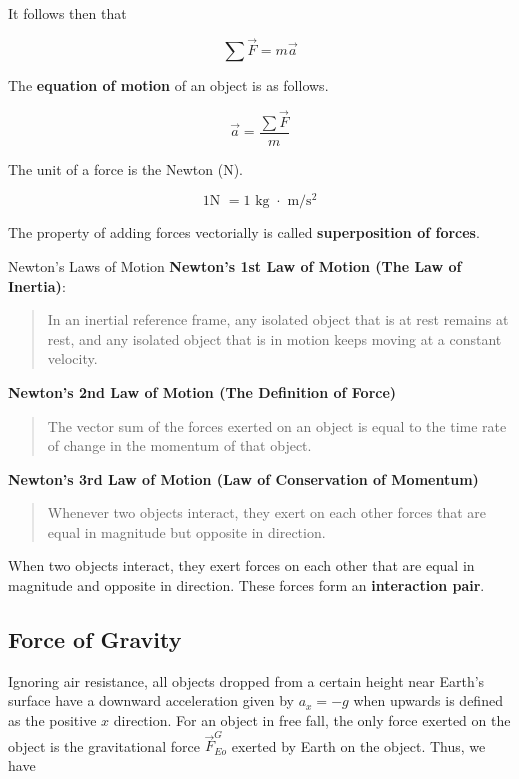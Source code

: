         It follows then that

        \[
            \sum \vec{F} = m\vec{a}
        \]

        The \textbf{equation of motion} of an object is as follows.

        \[
            \vec{a} = \frac{\sum \vec{F}}{m}
        \]

        The unit of a force is the Newton (N).

        \[
            1 \text{N } = 1 \text{ kg } \cdot \text{ m/}\text{s}^2
        \]

        The property of adding forces vectorially is called \textbf{superposition of forces}.

        \begin{tbhtheorem}{Newton's Laws of Motion}
            \textbf{Newton's 1st Law of Motion (The Law of Inertia)}:
            \begin{quote}
                In an inertial reference frame, any isolated object that is at rest remains at rest, and any isolated object that is in motion keeps moving at a constant velocity.
            \end{quote}

            \textbf{Newton's 2nd Law of Motion (The Definition of Force)}
            \begin{quote}
                The vector sum of the forces exerted on an object is equal to the time rate of change in the momentum of that object.
            \end{quote}

            \textbf{Newton's 3rd Law of Motion (Law of Conservation of Momentum)}
            \begin{quote}
                Whenever two objects interact, they exert on each other forces that are equal in magnitude but opposite in direction.
            \end{quote}
        \end{tbhtheorem}

        When two objects interact, they exert forces on each other that are equal in magnitude and opposite in direction. These forces form an \textbf{interaction pair}.


    \subsection{Force of Gravity}

        Ignoring air resistance, all objects dropped from a certain height near Earth's surface have a downward acceleration given by $a_x = -g$ when upwards is defined as the positive $x$ direction. For an object in
        free fall, the only force exerted on the object is the gravitational force $\vec{F}^G_{Eo}$ exerted by Earth on the object. Thus, we have


